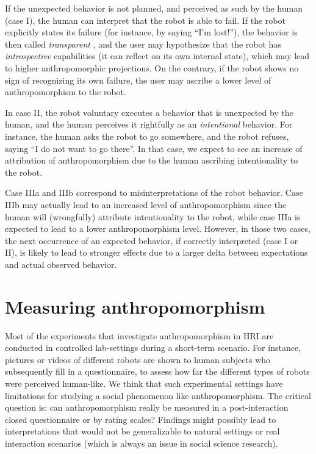 \documentclass{frontiersSCNS} %
\begin{document}
If the unexpected behavior is not planned, and perceived as such by the human
(case I), the human can interpret that the robot is able to fail. If the robot
explicitly states its failure (for instance, by saying ``I'm lost!''), the
behavior is then called \emph{transparent} \citep{kim_who_2006}, and the user
may hypothesize that the robot has \emph{introspective} capabilities (it can
reflect on its own internal state), which may lead to higher anthropomorphic
projections.  On the contrary, if the robot shows no sign of recognizing its own
failure, the user may ascribe a lower level of anthropomorphism to the robot.

In case II, the robot voluntary executes a behavior that is unexpected by the
human, and the human perceives it rightfully as an \emph{intentional} behavior.
For instance, the human asks the robot to go somewhere, and the robot refuses,
saying ``I do not want to go there''. In that case, we expect to see an increase
of attribution of anthropomorphism due to the human ascribing intentionality to
the robot.

Case IIIa and IIIb correspond to misinterpretations of the robot behavior. Case
IIIb may actually lead to an increased level of anthropomorphism since the human
will (wrongfully) attribute intentionality to the robot, while case IIIa is
expected to lead to a lower anthropomorphism level.  However, in those two
cases, the next occurrence of an expected behavior, if correctly interpreted
(case I or II), is likely to lead to stronger effects due to a larger delta 
between expectations and actual observed behavior. 

%
%
%
%
%
%

\section{Measuring anthropomorphism}
\label{sec:measuring}

Most of the experiments that investigate anthropomorphism in HRI are
conducted in controlled lab-settings during a short-term scenario. For instance,
pictures or videos of different robots are shown to human subjects who
subsequently fill in a questionnaire, to assess how far the different types of
robots were perceived human-like. We think that such experimental
settings have limitations for studying a social phenomenon like
anthropomorphism. The critical question is: can anthropomorphism really be
measured in a post-interaction closed questionnaire or by rating scales?
Findings might possibly lead to interpretations that would not be generalizable
to natural settings or real interaction scenarios (which is always an issue in
social science research).
\end{document}

